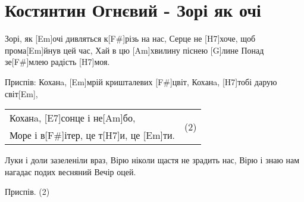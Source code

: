 \section{Костянтин Огнєвий - Зорі як очі}
\begin{guitar}
Зорі, як [Em]очі дивляться к[F#]різь на нас,
Серце не [H7]хоче, щоб прома[Em]йнув цей час,
Хай в цю [Am]хвилину піснею [G]лине
Понад зе[F#]млею радість [H7]моя.


Приспів:
Коханa, [Em]мрій кришталевих [F#]цвіт,
Коханa, [H7]тобі дарую світ[Em],
\begin{tabular}{ @{}l | l }
Коханa, [E7]сонце і не[Am]бо, & \multirow{2}{*}{ (2) } \\
Море і в[F#]ітер, це т[H7]и, це [Em]ти.
\end{tabular}


Луки і доли зазеленіли враз,
Вірю ніколи щастя не зрадить нас,
Вірю і знаю нам нагадає подих весняний
Вечір оцей.

Приспів. (2)
\end{guitar}
